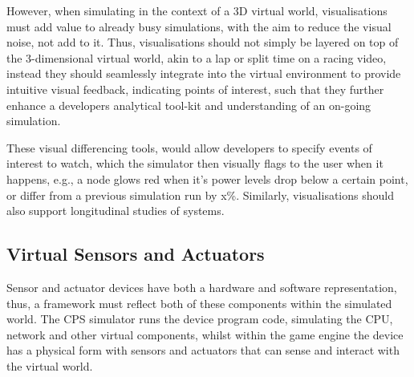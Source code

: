 However, when simulating in the context of a 3D virtual world, visualisations must add value to already busy simulations, with the aim to reduce the visual noise, not add to it. Thus, visualisations should not simply be layered on top of the 3-dimensional virtual world, akin to a lap or split time on a racing video, instead they should seamlessly integrate into the virtual environment to provide intuitive visual feedback, indicating points of interest, such that they further enhance a developers analytical tool-kit and understanding of an on-going simulation. 


These visual differencing tools, would allow developers to specify events of interest to watch, which the simulator then visually flags to the user when it happens, e.g., a node glows red when it's power levels drop below a certain point, or differ from a previous simulation run by x\%. Similarly, visualisations should also support longitudinal studies of systems.

\subsection{Virtual Sensors and Actuators}
\label{sub:requirements_Virtual Sensors and Actuators}
Sensor and actuator devices have both a hardware and software representation, thus, a framework must reflect both of these components within the simulated world. The CPS simulator runs the device program code, simulating the CPU, network and other virtual components, whilst within the game engine the device has a physical form with sensors and actuators that can sense and interact with the virtual world. 

